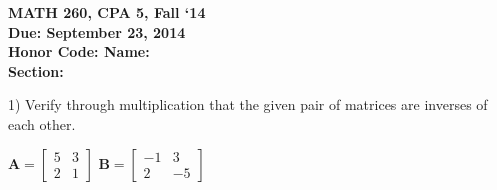 \documentclass{article}
\begin{document}
\begin{flushleft}
	\bfseries{MATH 260, CPA 5, Fall `14}\\
	\bfseries{Due: September 23, 2014}\\
	\bfseries{Honor Code:} \hspace{3.5in}\bfseries{Name:}\\
	\hspace{4.37in}\bfseries{Section:}
\end{flushleft}
\begin{flushleft}
\vspace{.25in}

1) Verify through multiplication that the given pair of matrices are inverses of each other.

\begin{center}

$\textbf{A}=\left[
\begin{array}{cc}
5 & 3\\
2 & 1
\end{array}
\right]
$
\hspace{0.1in}
$\textbf{B}=\left[
\begin{array}{cc}
-1 & 3 \\
2 & -5
\end{array}
\right]
$

\end{center}

\end{flushleft}
\end{document}
